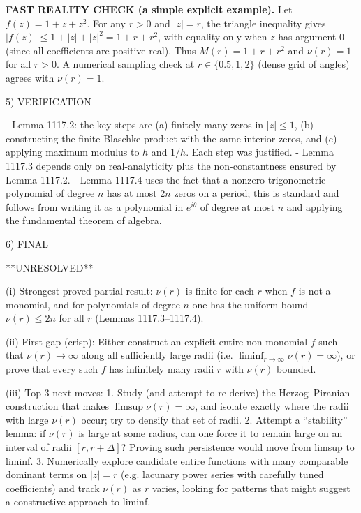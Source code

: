 \textbf{FAST REALITY CHECK (a simple explicit example).}
Let \(f(z)=1+z+z^2\). For any \(r>0\) and \(|z|=r\), the triangle inequality gives
\(|f(z)|\le 1+|z|+|z|^2 = 1+r+r^2\), with equality only when \(z\) has argument \(0\) (since all coefficients are positive real). Thus \(M(r)=1+r+r^2\) and \(\nu(r)=1\) for all \(r>0\).
A numerical sampling check at \(r\in\{0.5,1,2\}\) (dense grid of angles) agrees with \(\nu(r)=1\).

5) VERIFICATION

- Lemma 1117.2: the key steps are (a) finitely many zeros in \(|z|\le 1\), (b) constructing the finite Blaschke product with the same interior zeros, and (c) applying maximum modulus to \(h\) and \(1/h\). Each step was justified.
- Lemma 1117.3 depends only on real-analyticity plus the non-constantness ensured by Lemma 1117.2.
- Lemma 1117.4 uses the fact that a nonzero trigonometric polynomial of degree \(n\) has at most \(2n\) zeros on a period; this is standard and follows from writing it as a polynomial in \(e^{i\theta}\) of degree at most \(n\) and applying the fundamental theorem of algebra.

6) FINAL

**UNRESOLVED**

(i) Strongest proved partial result: \(\nu(r)\) is finite for each \(r\) when \(f\) is not a monomial, and for polynomials of degree \(n\) one has the uniform bound \(\nu(r)\le 2n\) for all \(r\) (Lemmas 1117.3--1117.4).

(ii) First gap (crisp): Either construct an explicit entire non-monomial \(f\) such that \(\nu(r)\to\infty\) along all sufficiently large radii (i.e. \(\liminf_{r\to\infty}\nu(r)=\infty\)), or prove that every such \(f\) has infinitely many radii \(r\) with \(\nu(r)\) bounded.

(iii) Top 3 next moves:
1. Study (and attempt to re-derive) the Herzog--Piranian construction that makes \(\limsup\nu(r)=\infty\), and isolate exactly where the radii with large \(\nu(r)\) occur; try to densify that set of radii.
2. Attempt a ``stability'' lemma: if \(\nu(r)\) is large at some radius, can one force it to remain large on an interval of radii \([r,r+\Delta]\)? Proving such persistence would move from limsup to liminf.
3. Numerically explore candidate entire functions with many comparable dominant terms on \(|z|=r\) (e.g. lacunary power series with carefully tuned coefficients) and track \(\nu(r)\) as \(r\) varies, looking for patterns that might suggest a constructive approach to liminf.

